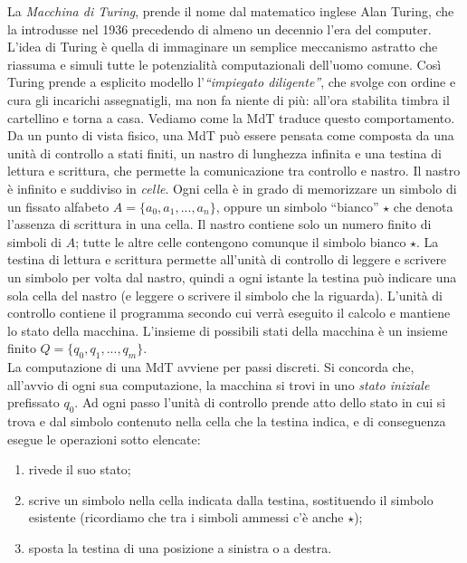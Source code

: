 \documentclass[12pt,a4paper]{report}
\theoremstyle{definition}
\begin{document}
La \emph{Macchina di Turing}, prende il nome dal matematico inglese Alan Turing, che la introdusse nel 1936 precedendo di almeno un decennio l'era del computer.
L'idea di Turing è quella di immaginare un semplice meccanismo astratto che riassuma e simuli tutte le potenzialità computazionali dell'uomo comune. Così Turing prende a esplicito modello l'\emph{``impiegato diligente''}, che svolge con ordine e cura gli incarichi assegnatigli, ma non fa niente di più: all'ora stabilita timbra il cartellino e torna a casa. Vediamo come la MdT traduce questo comportamento.\\
Da un punto di vista fisico, una MdT può essere pensata come composta da una unità di controllo a stati finiti, un nastro di lunghezza infinita e una testina di lettura e scrittura, che permette la comunicazione tra controllo e nastro.
Il nastro è infinito e suddiviso in \emph{celle}. Ogni cella è in grado di memorizzare un simbolo di un fissato alfabeto $A=\{a_0,a_1,...,a_n\}$, oppure un simbolo ``bianco'' $\star$ che denota l'assenza di scrittura in una cella. Il nastro contiene solo un numero finito di simboli di $A$; tutte le altre celle contengono comunque il simbolo bianco $\star$. La testina di lettura e scrittura permette all'unità di controllo di leggere e scrivere un simbolo per volta dal nastro, quindi a ogni istante la testina può indicare una sola cella del nastro (e leggere o scrivere il simbolo che la riguarda). L'unità di controllo contiene il programma secondo cui verrà eseguito il calcolo e mantiene lo stato della macchina. L'insieme di possibili stati della macchina è un insieme finito $Q=\{q_0,q_1,...,q_m\}$.\\
La computazione di una MdT avviene per passi discreti. Si concorda che, all'avvio di ogni sua computazione, la macchina si trovi in uno \emph{stato iniziale} prefissato $q_0$. Ad ogni passo l'unità di controllo prende atto dello stato in cui si trova e dal simbolo contenuto nella cella che la testina indica, e di conseguenza esegue le operazioni sotto elencate:

\begin{enumerate}
\item rivede il suo stato;
\item scrive un simbolo nella cella indicata dalla testina, sostituendo il simbolo esistente (ricordiamo che tra i simboli ammessi c'è anche $\star$);
\item sposta la testina di una posizione a sinistra o a destra.
\end{enumerate}
\end{document}
